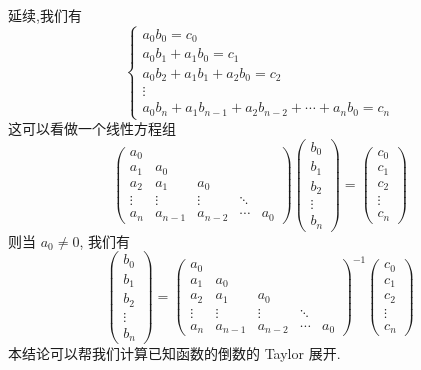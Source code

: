 \documentclass[../../main.tex]{subfiles}%
\begin{document}
\begin{conclusion}
延续,我们有
\[
\begin{cases}
a_0 b_0 = c_0 \\
a_0 b_1 + a_1 b_0 = c_1 \\
a_0 b_2 + a_1 b_1 + a_2 b_0 = c_2 \\
\vdots \\
a_0 b_n + a_1 b_{n-1} + a_2 b_{n-2} + \cdots + a_n b_0 = c_n
\end{cases}
\]
这可以看做一个线性方程组
\[
\begin{pmatrix}
a_0 \\
a_1 & a_0 \\
a_2 & a_1 & a_0 \\
\vdots & \vdots & \vdots & \ddots \\
a_n & a_{n-1} & a_{n-2} & \cdots & a_0
\end{pmatrix}
\begin{pmatrix}
b_0 \\
b_1 \\
b_2 \\
\vdots \\
b_n
\end{pmatrix}
=
\begin{pmatrix}
c_0 \\
c_1 \\
c_2 \\
\vdots \\
c_n
\end{pmatrix}
\]
则当 $a_0 \neq 0$, 我们有
\[
\begin{pmatrix}
b_0 \\
b_1 \\
b_2 \\
\vdots \\
b_n
\end{pmatrix}
=
\begin{pmatrix}
a_0 \\
a_1 & a_0 \\
a_2 & a_1 & a_0 \\
\vdots & \vdots & \vdots & \ddots \\
a_n & a_{n-1} & a_{n-2} & \cdots & a_0
\end{pmatrix}^{-1}
\begin{pmatrix}
c_0 \\
c_1 \\
c_2 \\
\vdots \\
c_n
\end{pmatrix}
\]
本结论可以帮我们计算已知函数的倒数的 Taylor 展开.
\end{conclusion}
\end{document}
